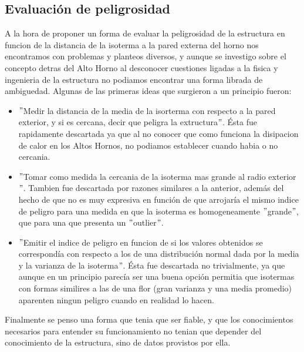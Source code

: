 \documentclass[12pt,a4paper]{article}
\begin{document}
\subsection{Evaluación de peligrosidad}

A la hora de proponer un forma de evaluar la peligrosidad de la estructura en funcion de la distancia de la isoterma a la pared externa del horno nos encontramos con problemas y planteos diversos, y aunque se investigo sobre el concepto detras del Alto Horno al desconocer cuestiones ligadas a la fisica y ingenieria de la estructura no podiamos encontrar una forma librada de ambiguedad. Algunas de las primeras ideas que surgieron a un principio fueron: 
   \begin{itemize}
		\item $"$Medir la distancia de la media de la isorterma con respecto a la pared exterior, y si es cercana, decir que peligra la extructura$"$. Ésta fue rapidamente descartada ya que al no conocer que como funciona la disipacion de calor en los Altos Hornos, no podiamos establecer cuando habia o no cercania.
        \item $"$Tomar como medida la cercania de la isoterma mas grande al radio exterior$"$. Tambien fue descartada por razones similares a la anterior, además del hecho de que no es muy expresiva en función de que arrojaría el mismo indice de peligro para una medida en que la isoterma es homogeneamente $"$grande$"$, que para una que presenta un $"$outlier$"$.
        \item $"$Emitir el indice de peligro en funcion de si los valores obtenidos se correspondía con respecto a los de una distribución normal dada por la media y la varianza de la isoterma$"$. Ésta fue descartada no trivialmente, ya que aunque en un principio parecía ser una buena opción permitia que isotermas con formas similires a las de una flor (gran varianza y una media promedio) aparenten ningun peligro cuando en realidad lo hacen.
	\end{itemize}
Finalmente se penso una forma que tenia que ser fiable, y que los conocimientos necesarios para entender su funcionamiento no tenian que depender del conocimiento de la estructura, sino de datos provistos por ella.
\end{document}
